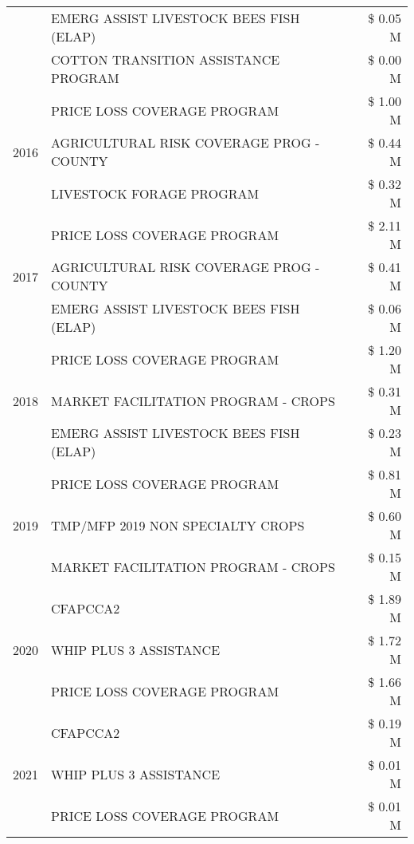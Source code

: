 \begin{tabular}{llr}
 & EMERG ASSIST LIVESTOCK BEES FISH (ELAP) & \$ 0.05 M \\
 & COTTON TRANSITION ASSISTANCE PROGRAM & \$ 0.00 M \\
\cline{1-3}
\multirow[t]{3}{*}{2016} & PRICE LOSS COVERAGE PROGRAM & \$ 1.00 M \\
 & AGRICULTURAL RISK COVERAGE PROG - COUNTY & \$ 0.44 M \\
 & LIVESTOCK FORAGE PROGRAM & \$ 0.32 M \\
\cline{1-3}
\multirow[t]{3}{*}{2017} & PRICE LOSS COVERAGE PROGRAM & \$ 2.11 M \\
 & AGRICULTURAL RISK COVERAGE PROG - COUNTY & \$ 0.41 M \\
 & EMERG ASSIST LIVESTOCK BEES FISH (ELAP) & \$ 0.06 M \\
\cline{1-3}
\multirow[t]{3}{*}{2018} & PRICE LOSS COVERAGE PROGRAM & \$ 1.20 M \\
 & MARKET FACILITATION PROGRAM - CROPS & \$ 0.31 M \\
 & EMERG ASSIST LIVESTOCK BEES FISH (ELAP) & \$ 0.23 M \\
\cline{1-3}
\multirow[t]{3}{*}{2019} & PRICE LOSS COVERAGE PROGRAM & \$ 0.81 M \\
 & TMP/MFP 2019 NON SPECIALTY CROPS & \$ 0.60 M \\
 & MARKET FACILITATION PROGRAM - CROPS & \$ 0.15 M \\
\cline{1-3}
\multirow[t]{3}{*}{2020} & CFAPCCA2 & \$ 1.89 M \\
 & WHIP PLUS 3 ASSISTANCE & \$ 1.72 M \\
 & PRICE LOSS COVERAGE PROGRAM & \$ 1.66 M \\
\cline{1-3}
\multirow[t]{3}{*}{2021} & CFAPCCA2 & \$ 0.19 M \\
 & WHIP PLUS 3 ASSISTANCE & \$ 0.01 M \\
 & PRICE LOSS COVERAGE PROGRAM & \$ 0.01 M \\
\cline{1-3}
\bottomrule
\end{tabular}
